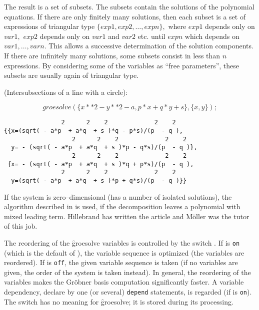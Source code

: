 The result is a set of subsets. The subsets contain the solutions of the
polynomial equations. If there are only finitely many solutions,
then each subset is a set of expressions of triangular type
$\{exp1, exp2,\ldots , expn\},$ where $exp1$ depends only on
$var1,$ $exp2$ depends only on $var1$ and $var2$ etc. until $expn$ which
depends on $var1,\ldots,varn.$ This allows a successive determination of
the solution components. If there are infinitely many solutions,
some subsets consist in less than $n$ expressions. By considering some
of the variables as ``free parameters'',  these subsets are usually
again of triangular type.

\example (Intersubsections of a line with a circle):

\[ groesolve(\{x**2 - y**2 - a, p*x+q*y+s\},\{x,y\}); \]

\begin{verbatim}
                2      2    2             2    2
{{x=(sqrt( - a*p  + a*q  + s )*q - p*s)/(p  - q ),
                   2      2    2             2    2
  y= - (sqrt( - a*p  + a*q  + s )*p - q*s)/(p  - q )},
                   2      2    2             2    2
 {x= - (sqrt( - a*p  + a*q  + s )*q + p*s)/(p  - q ),
                2      2    2             2    2
  y=(sqrt( - a*p  + a*q  + s )*p + q*s)/(p  - q )}}
\end{verbatim}

If the system is zero--dimensional (has a number of isolated solutions),
the algorithm described in \cite{Hillebrand:99} is used, if the decomposition
leaves a polynomial with mixed leading term. Hillebrand has written the
article and M\"oller was the tutor of this job.

The reordering of the \f{groesolve} variables is controlled by the
\REDUCE switch . If  is \texttt{on} (which is the default
of ), the variable sequence is optimized (the variables are reordered).
If  is \texttt{off}, the given variable sequence is taken (if no variables
are given, the order of the \REDUCE system is taken instead). In general, the
reordering of the variables makes the Gr\"obner basis computation
significantly faster.
A variable dependency, declare by one (or several) \texttt{depend} statements,
is regarded (if  is \texttt{on}). The switch  has no meaning
for \f{groesolve}; it is stored during its processing.

